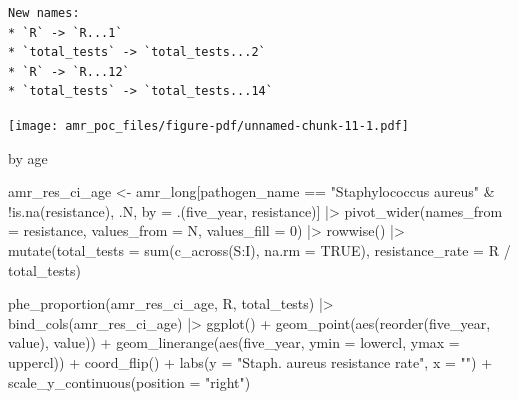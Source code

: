 \documentclass[
  letterpaper,
  DIV=11,
  numbers=noendperiod]{scrreprt}
\newenvironment{Shaded}{\begin{snugshade}}{\end{snugshade}}
\newcommand{\AttributeTok}[1]{\textcolor[rgb]{0.40,0.45,0.13}{#1}}
\newcommand{\ConstantTok}[1]{\textcolor[rgb]{0.56,0.35,0.01}{#1}}
\newcommand{\DecValTok}[1]{\textcolor[rgb]{0.68,0.00,0.00}{#1}}
\newcommand{\FunctionTok}[1]{\textcolor[rgb]{0.28,0.35,0.67}{#1}}
\newcommand{\NormalTok}[1]{\textcolor[rgb]{0.00,0.23,0.31}{#1}}
\newcommand{\OtherTok}[1]{\textcolor[rgb]{0.00,0.23,0.31}{#1}}
\newcommand{\SpecialCharTok}[1]{\textcolor[rgb]{0.37,0.37,0.37}{#1}}
\newcommand{\StringTok}[1]{\textcolor[rgb]{0.13,0.47,0.30}{#1}}
\begin{document}
\begin{verbatim}
New names:
* `R` -> `R...1`
* `total_tests` -> `total_tests...2`
* `R` -> `R...12`
* `total_tests` -> `total_tests...14`
\end{verbatim}

\texttt{[image: amr\_poc\_files/figure-pdf/unnamed-chunk-11-1.pdf]}

by age

\begin{Shaded}
\begin{Highlighting}[]
\NormalTok{amr\_res\_ci\_age }\OtherTok{\textless{}{-}}\NormalTok{ amr\_long[pathogen\_name }\SpecialCharTok{==} \StringTok{"Staphylococcus aureus"} \SpecialCharTok{\&} \SpecialCharTok{!}\FunctionTok{is.na}\NormalTok{(resistance), .N, by }\OtherTok{=}\NormalTok{ .(five\_year, resistance)] }\SpecialCharTok{|\textgreater{}}
    \FunctionTok{pivot\_wider}\NormalTok{(}\AttributeTok{names\_from =}\NormalTok{ resistance, }\AttributeTok{values\_from =}\NormalTok{ N, }\AttributeTok{values\_fill =} \DecValTok{0}\NormalTok{) }\SpecialCharTok{|\textgreater{}}
    \FunctionTok{rowwise}\NormalTok{() }\SpecialCharTok{|\textgreater{}}
    \FunctionTok{mutate}\NormalTok{(}\AttributeTok{total\_tests =} \FunctionTok{sum}\NormalTok{(}\FunctionTok{c\_across}\NormalTok{(S}\SpecialCharTok{:}\NormalTok{I), }\AttributeTok{na.rm =} \ConstantTok{TRUE}\NormalTok{), }
           \AttributeTok{resistance\_rate =}\NormalTok{ R }\SpecialCharTok{/}\NormalTok{ total\_tests)}

\FunctionTok{phe\_proportion}\NormalTok{(amr\_res\_ci\_age, R, total\_tests) }\SpecialCharTok{|\textgreater{}}
    \FunctionTok{bind\_cols}\NormalTok{(amr\_res\_ci\_age) }\SpecialCharTok{|\textgreater{}}
    \FunctionTok{ggplot}\NormalTok{() }\SpecialCharTok{+}
    \FunctionTok{geom\_point}\NormalTok{(}\FunctionTok{aes}\NormalTok{(}\FunctionTok{reorder}\NormalTok{(five\_year, value), value)) }\SpecialCharTok{+}
    \FunctionTok{geom\_linerange}\NormalTok{(}\FunctionTok{aes}\NormalTok{(five\_year, }\AttributeTok{ymin =}\NormalTok{ lowercl, }\AttributeTok{ymax =}\NormalTok{ uppercl)) }\SpecialCharTok{+}
    \FunctionTok{coord\_flip}\NormalTok{() }\SpecialCharTok{+}
    \FunctionTok{labs}\NormalTok{(}\AttributeTok{y =} \StringTok{"Staph. aureus resistance rate"}\NormalTok{, }\AttributeTok{x =} \StringTok{""}\NormalTok{) }\SpecialCharTok{+} 
    \FunctionTok{scale\_y\_continuous}\NormalTok{(}\AttributeTok{position =} \StringTok{"right"}\NormalTok{)}
\end{Highlighting}
\end{Shaded}
\end{document}
